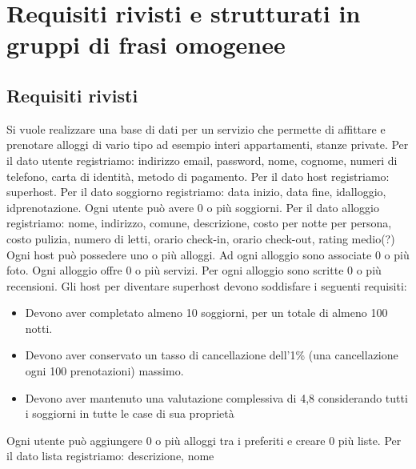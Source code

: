 \documentclass[letterpaper]{report}
\begin{document}
\section{Requisiti rivisti e strutturati in gruppi di frasi omogenee}
\subsection{Requisiti rivisti}
Si vuole realizzare una base di dati per un servizio che permette di affittare e prenotare
alloggi di vario tipo ad esempio interi appartamenti, stanze private.
\newline
\newline
Per il dato utente registriamo: indirizzo email, password, nome, cognome, numeri di telefono, carta di identità, metodo di pagamento.
\newline
\newline
Per il dato host registriamo: superhost.
\newline
\newline
Per il dato soggiorno registriamo: data inizio, data fine, idalloggio, idprenotazione.
Ogni utente può avere 0 o più soggiorni.
\newline
\newline
Per il dato alloggio registriamo: nome, indirizzo, comune, descrizione, costo per notte per  persona, costo pulizia, numero di letti, orario check-in, orario check-out, rating medio(?)
Ogni host può possedere uno o più alloggi. Ad ogni alloggio sono associate 0 o più foto. Ogni alloggio offre 0 o più servizi. Per ogni alloggio sono scritte 0 o più recensioni.
\newline
\newline
Gli host per diventare superhost devono soddisfare i  seguenti requisiti:
\begin{itemize}
    \item Devono aver completato almeno 10 soggiorni, per un totale di almeno 100 notti.
    \item Devono aver conservato un tasso di cancellazione dell'1\% 
    (una cancellazione ogni 100 prenotazioni) massimo.
    \item Devono aver mantenuto una valutazione complessiva di 4,8 considerando 
    tutti i soggiorni in tutte le case di sua proprietà
\end{itemize}
Ogni utente può aggiungere 0 o più alloggi tra i preferiti e creare 0 più liste.
Per il dato lista registriamo: descrizione, nome
\newline
\newline
\end{document}
